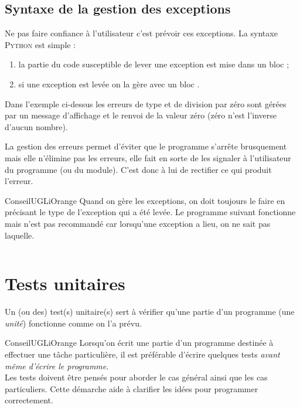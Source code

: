 \documentclass[a4paper,12pt,french]{book}
\begin{document}
\subsection{Syntaxe de la gestion des exceptions}
Ne pas faire confiance à l'utilisateur c'est prévoir ces exceptions. La syntaxe \textsc{Python} est simple :
\begin{enumerate}[--]
	\item 	la partie du code susceptible de lever une exception est mise dans un bloc ;
	\item 	si une exception est levée on la gère avec un bloc .
\end{enumerate}


Dans l'exemple ci-dessus les erreurs de type et de division par zéro sont gérées par un message d'affichage et le renvoi de la valeur zéro (zéro n'est l'inverse d'aucun nombre).

\begin{remarque}[]
	La gestion des erreurs permet d'éviter que le programme s'arrête brusquement mais elle n'élimine pas les erreurs, elle fait en sorte de les signaler à l'utilisateur du programme (ou du module). C'est donc à lui de rectifier ce qui produit l'erreur.
\end{remarque}

\begin{encadrecolore}{Conseil}{UGLiOrange}
	Quand on gère les exceptions, on doit toujours le faire en précisant le type de l'exception qui a été levée. Le programme suivant fonctionne mais n'est pas recommandé car lorsqu'une exception a lieu, on ne sait pas laquelle.
\inputminted{python}{scripts/fonction2.py}
\end{encadrecolore}


\section{Tests unitaires}

\begin{definition}
Un (ou des) test(s) unitaire(s) sert à vérifier qu'une partie d'un programme (une \textit{unité}) fonctionne comme on l'a prévu.
\end{definition}

\begin{encadrecolore}{Conseil}{UGLiOrange}
Lorsqu'on écrit une partie d'un programme destinée à effectuer une tâche particulière, il est préférable d'écrire quelques tests \textit{avant même d'écrire le programme}.\\
Les tests doivent être pensés pour aborder le cas général ainsi que les cas particuliers. Cette démarche aide à clarifier les idées pour programmer correctement.
\end{encadrecolore}
\end{document}
